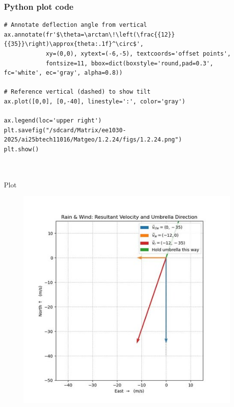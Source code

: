 \documentclass{beamer}
\begin{document}
\begin{frame}[fragile]
    \frametitle{Python plot code}
    \begin{lstlisting}
# Annotate deflection angle from vertical
ax.annotate(fr'$\theta=\arctan\!\left(\frac{{12}}{{35}}\right)\approx{theta:.1f}^\circ$',
            xy=(0,0), xytext=(-6,-5), textcoords='offset points',
            fontsize=11, bbox=dict(boxstyle='round,pad=0.3', fc='white', ec='gray', alpha=0.8))

# Reference vertical (dashed) to show tilt
ax.plot([0,0], [0,-40], linestyle=':', color='gray')

ax.legend(loc='upper right')
plt.savefig("/sdcard/Matrix/ee1030-2025/ai25btech11016/Matgeo/1.2.24/figs/1.2.24.png")
plt.show()



\end{lstlisting}
 
\end{frame}
\begin{frame}{Plot} 
\begin{figure}[h]
    \centering
    \includegraphics[scale=0.5]{figs/1.2.24.jpg}
    \caption{}
    \label{fig:1}
\end{figure}
\end{frame}
\end{document}
